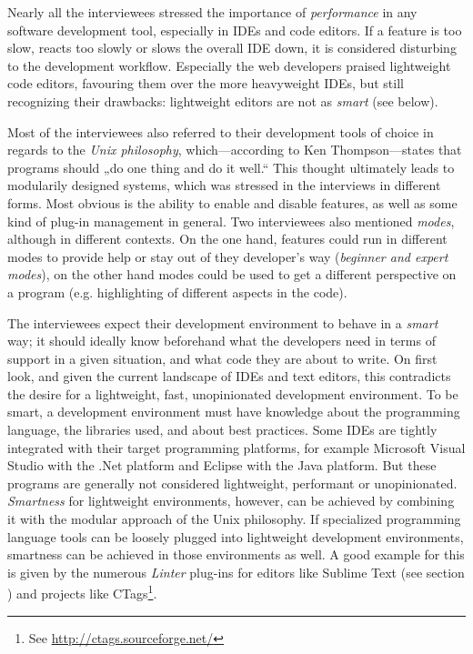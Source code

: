 Nearly all the interviewees stressed the importance of
\emph{performance} in any software development tool, especially in IDEs
and code editors. If a feature is too slow, reacts too slowly or slows
the overall IDE down, it is considered disturbing to the development
workflow. Especially the web developers praised lightweight code
editors, favouring them over the more heavyweight IDEs, but still
recognizing their drawbacks: lightweight editors are not as \emph{smart}
(see below).

Most of the interviewees also referred to their development tools of
choice in regards to the \emph{Unix philosophy}, which—according to Ken
Thompson—states that programs should „do one thing and do it well.“
\cite{raymond} This thought ultimately leads to modularily designed
systems, which was stressed in the interviews in different forms. Most
obvious is the ability to enable and disable features, as well as some
kind of plug-in management in general. Two interviewees also mentioned
\emph{modes}, although in different contexts. On the one hand, features
could run in different modes to provide help or stay out of they
developer’s way (\emph{beginner and expert modes}), on the other hand
modes could be used to get a different perspective on a program (e.g.
highlighting of different aspects in the code).

The interviewees expect their development environment to behave in a
\emph{smart} way; it should ideally know beforehand what the developers
need in terms of support in a given situation, and what code they are
about to write. On first look, and given the current landscape of IDEs
and text editors, this contradicts the desire for a lightweight, fast,
unopinionated development environment. To be smart, a development
environment must have knowledge about the programming language, the
libraries used, and about best practices. Some IDEs are tightly
integrated with their target programming platforms, for example
Microsoft Visual Studio with the .Net platform and Eclipse with the Java
platform. But these programs are generally not considered lightweight,
performant or unopinionated. \emph{Smartness} for lightweight
environments, however, can be achieved by combining it with the modular
approach of the Unix philosophy. If specialized programming language
tools can be loosely plugged into lightweight development environments,
smartness can be achieved in those environments as well. A good example
for this is given by the numerous \emph{Linter} plug-ins for editors
like Sublime Text (see section ) and projects like
CTags\footnote{See \url{http://ctags.sourceforge.net/}}.

